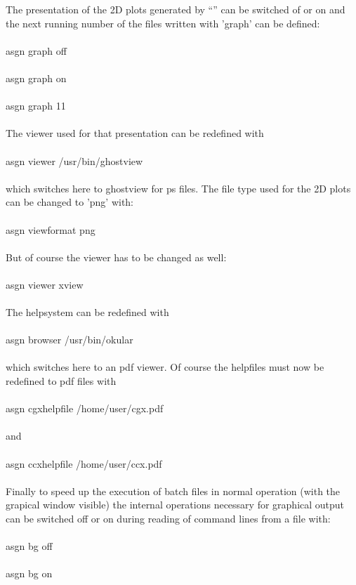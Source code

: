 \documentclass{article}
\begin{document}
The presentation of the 2D plots generated by ``'' can be switched of or on and the next running number of the files written with 'graph' can be defined:\\\\asgn graph off\\\\asgn graph on\\\\asgn graph 11\\\\
The viewer used for that presentation can be redefined with\\\\asgn viewer /usr/bin/ghostview\\\\which switches here to ghostview for ps files. The file type used for the 2D plots can be changed to 'png' with:\\\\asgn viewformat png\\\\But of course the viewer has to be changed as well:\\\\asgn viewer xview\\\\

The helpsystem can be redefined with\\\\asgn browser /usr/bin/okular\\\\which switches here to an pdf viewer. Of course the helpfiles must now be redefined to pdf files with\\\\asgn cgxhelpfile /home/user/cgx.pdf\\\\and\\\\asgn ccxhelpfile /home/user/ccx.pdf\\\\

Finally to speed up the execution of batch files in normal operation (with the grapical window visible) the internal operations necessary for graphical output can be switched off or on during reading of command lines from a file with:\\\\asgn bg off\\\\asgn bg on\\\\
\end{document}
